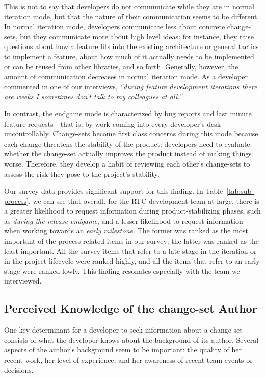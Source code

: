 This is not to say that developers do not communicate while they are in normal iteration  mode, but that the nature of their communication seems to be different. In normal iteration mode, developers communicate less about concrete change-sets, but they communicate more about high level ideas: for instance, they raise questions about how a feature fits into the existing architecture or general tactics to implement a feature, about how much of it actually needs to be implemented or can be reused from other libraries, and so forth. Generally, however, the amount of communication decreases in normal iteration mode. As a developer commented in one of our interviews, \emph{``during feature development iterations there are weeks I sometimes don't talk to my colleagues at all.''} 

In contrast, the endgame mode is characterized by bug reports and last minute feature requests---that is, by work coming into every developer's desk uncontrollably. Change-sets become first class concerns during this mode because each change threatens the stability of the product: developers need to evaluate whether the change-set actually improves the product instead of making things worse. Therefore, they develop a habit of reviewing each other's change-sets to assess the risk they pose to the project's stability.

Our survey data provides significant support for this finding. In Table~\ref{tab:sub-process}, we can see that overall, for the RTC development team at large, there is a greater likelihood to request information during product-stabilizing phases, such as 
\emph{during the release endgame}, and a lesser likelihood to request information when working towards an \emph{early milestone}. The former was ranked as the most important of the process-related items in our survey; the latter was ranked as the least important. All the survey items that refer to a late stage in the iteration or in the project lifecycle were ranked highly, and all the items that refer to an early stage were ranked lowly. This finding resonates especially with the team we interviewed. 


\subsection{Perceived Knowledge of the change-set Author}
One key determinant for a developer to seek information about a change-set consists of what the developer knows about the background of its author. Several aspects of the author's background seem to be important: the quality of her recent work, her level of experience, and her awareness of recent team events or decisions.

